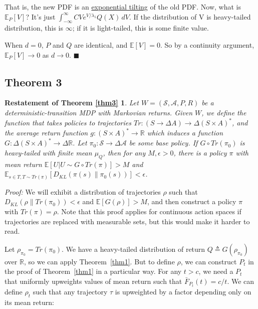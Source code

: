 \documentclass{article}
\begin{document}
That is, the new PDF is an
\href{https://en.wikipedia.org/wiki/Exponential_tilting}{exponential
tilting} of the old PDF. Now, what is \(\mathbb E_P[V]\)? It's just
\(\int_{-\infty}^{\infty} C V e^{V/\lambda_1} Q(X) \,dV\). If the
distribution of V is heavy-tailed distribution, this is \(\infty\); if
it is light-tailed, this is some finite value.

When \(d = 0\), \(P\) and \(Q\) are identical, and \(\mathbb E[V] = 0\).
So by a continuity argument, \(\mathbb E_P[V] \to 0\) as \(d \to 0\).
\(\blacksquare\)


\subsection{Theorem 3}
\newtheorem*{theorem3}{Restatement of Theorem \ref{thm3}}
\begin{theorem3}
Let \(W = (\mathcal S, \mathcal A, P, R)\) be
a deterministic-transition MDP with Markovian returns. Given \(W\), we
define the function that takes policies to trajectories
\(Tr: (S \to \Delta A) \to \Delta(S \times A)^*\), and the average
return function \(g: (S \times A)^* \to \mathbb R\) which induces a
function \(G: \Delta(S \times A)^* \to \Delta \mathbb R\). Let
\(\pi_0: \mathcal S \to \Delta \mathcal A\) be some base policy. If
\(G \circ Tr(\pi_0)\) is heavy-tailed with finite mean \(\mu_Q\), then
for any \(M, \epsilon > 0\), there is a policy \(\pi\) with mean return
\(\mathbb E[U | U \sim G \circ Tr(\pi)] > M\) and
\(\mathbb E_{s \in T, T\sim Tr(\pi)}[D_{KL}(\pi(s) \| \pi_0(s))] < \epsilon\).
\end{theorem3}

\emph{Proof:} We will exhibit a distribution of trajectories \(\rho\)
such that \(D_{KL}(\rho \| Tr(\pi_0)) < \epsilon\) and
\(\mathbb E[G(\rho)] > M\), and then construct a policy \(\pi\) with
\(Tr(\pi) = \rho\). Note that this proof applies for continuous action
spaces if trajectories are replaced with measurable sets, but this would
make it harder to read.

Let \(\rho_{\pi_0} = Tr(\pi_0)\). We have a heavy-tailed distribution of
return \(Q \triangleq G(\rho_{\pi_0})\) over \(\mathbb R\), so we can
apply Theorem~\ref{thm1}. But to define \(\rho\), we can construct \(P_t\) in the
proof of Theorem~\ref{thm1} in a particular way. For any \(t>c\), we need a
\(P_t\) that uniformly upweights values of mean return such that
\(\bar F_{P_t}(t) = c/t\). We can define \(\rho_t\) such that any
trajectory \(\tau\) is upweighted by a factor depending only on its mean
return:
\end{document}
